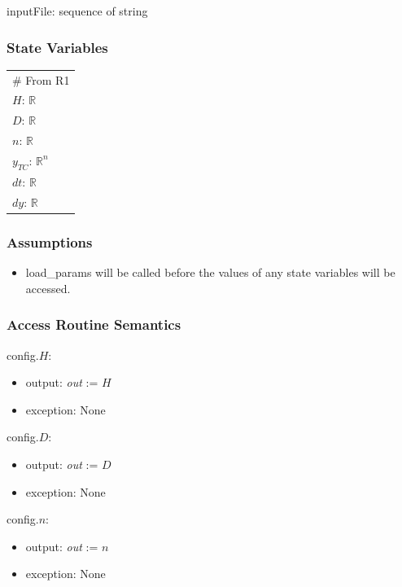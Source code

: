 \documentclass[12pt, titlepage]{article}
\begin{document}
inputFile: sequence of string

\subsubsection{State Variables}

\renewcommand{\arraystretch}{1.2}
\begin{longtable*}[l]{l} 
\# From R1\\
$H$: $\mathbb{R}$ \\
$D$: $\mathbb{R}$ \\
$n$: $\mathbb{R}$ \\
$y_{TC}$: $\mathbb{R}^n$ \\
$dt$: $\mathbb{R}$ \\
$dy$: $\mathbb{R}$\\
\end{longtable*}

\subsubsection{Assumptions}

\begin{itemize}

\item load\_params will be called before the values of any state variables will be accessed.

\end{itemize}

\subsubsection{Access Routine Semantics}

\noindent config.$H$:
\begin{itemize}
\item output: \textit{out} := $H$
\item exception: None
\end{itemize}

\noindent config.$D$:
\begin{itemize}
\item output: \textit{out} := $D$
\item exception: None
\end{itemize}

\noindent config.$n$:
\begin{itemize}
\item output: \textit{out} := $n$
\item exception: None
\end{itemize}
\end{document}
